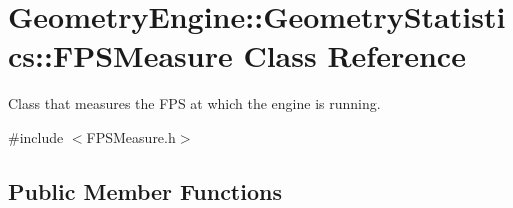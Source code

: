 \hypertarget{class_geometry_engine_1_1_geometry_statistics_1_1_f_p_s_measure}{}\section{Geometry\+Engine\+::Geometry\+Statistics\+::F\+P\+S\+Measure Class Reference}
\label{class_geometry_engine_1_1_geometry_statistics_1_1_f_p_s_measure}


Class that measures the F\+PS at which the engine is running.  




{\ttfamily \#include $<$F\+P\+S\+Measure.\+h$>$}

\subsection*{Public Member Functions}
